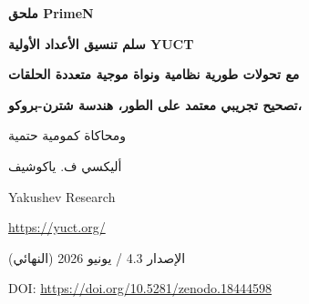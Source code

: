 \documentclass[12pt,a4paper]{article}
\newcommand{\kappac}{\kappa_c}
\newcommand{\Seven}{S_{\mathrm{even}}}
\begin{document}
	
	\begin{titlepage}
		\centering
		\vspace*{0cm}
		
		{\Huge\bfseries ملحق PrimeN\par}
		\vspace{0.5cm}
		{\Large\bfseries سلم تنسيق الأعداد الأولية YUCT\par}
		\vspace{0.3cm}
		{\Large\bfseries مع تحولات طورية نظامية ونواة موجية متعددة الحلقات\par}
		\vspace{0.3cm}
		{\Large\bfseries تصحيح تجريبي معتمد على الطور، هندسة شترن-بروكو،\par
			ومحاكاة كمومية حتمية\par}
		\vspace{1.0cm}
		
		{\large أليكسي ف. ياكوشيف\par}
		\vspace{0.3cm}
		{\normalsize Yakushev Research\par}
		{\normalsize \url{https://yuct.org/}\par}
		
		\vspace{0.5cm}
		{\normalsize الإصدار 4.3 / يونيو 2026 (النهائي)\par}
		\vspace{0.3cm}
		{\normalsize DOI: \url{https://doi.org/10.5281/zenodo.18444598}\par}
		
		\vfill
		
		\begin{abstract}
			\noindent
			نؤسس ارتباطًا صارمًا بين توزيع الأعداد الأولية ونظرية التنسيق الموحدة ياكوشيف (YUCT). يتحكم قانون الخطأ العام \(\varepsilon = \kappac \alpha K_{\mathrm{eff}}^{-\beta}\) (\(\beta=2/3\), \(\kappac=1/3\)) في التقلبات المقاربة للعدد الأولي \(p_n\) حول تقريب روسر الكلاسيكي. من الحلقة الجبرية لـ YUCT نشتق \textbf{تصحيحًا نظريًا} \(p_n \approx R_n - \frac{\Seven}{2}\, n^{1-\beta}\,\ln n\)، والذي \textbf{لا يحتوي على معاملات حرة} ويقدم وصفًا مقاربًا دقيقًا للاتجاه السلس لانحرافات الأعداد الأولية (النظرية~4).
			
			\textbf{الجديد في هذا الإصدار:} نكتشف ونشتق رياضيًا \textbf{تحولات طورية متتالية} لشبكة الفراغ، والتي تظهر كقلبات إشارة تصحيح الحلقة الأولى عند المؤشرات الحرجة \(N_f = 80,\,96.5,\,113,\,\dots\) بخطوة \(\Delta N = 16.5\)، المستمدة مباشرة من عدد فرميونات فايل \(L_0 = 96\) والثابت القطاعي الزوجي \(\Seven = 0.8\). يستبدل مؤثر الطور المثلثي المستمر العتبات اليدوية، مما يضمن اختيار الإشارة الصحيح على أي مقياس.
			

\end{abstract}
\end{titlepage}
\end{document}
